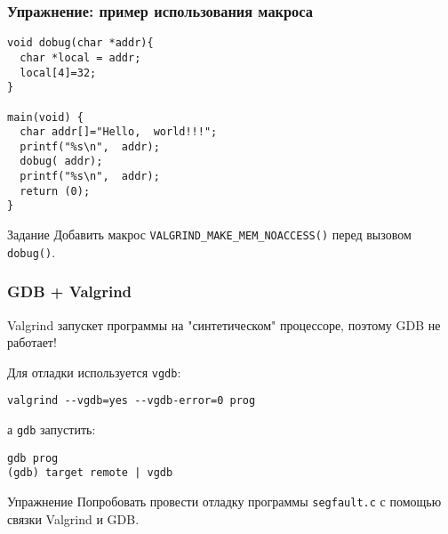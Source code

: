 \begin{frame}[fragile]
	\frametitle{Упражнение: пример использования макроса}

	\begin{lstlisting}
void dobug(char *addr){
  char *local = addr;
  local[4]=32;
}

main(void) {
  char addr[]="Hello,  world!!!";
  printf("%s\n",  addr);
  dobug( addr);
  printf("%s\n",  addr);
  return (0);
}
	\end{lstlisting}


	\begin{block}{Задание}
		Добавить макрос {\tt VALGRIND\_MAKE\_MEM\_NOACCESS()} перед вызовом {\tt dobug()}.
	\end{block}

\end{frame}


\begin{frame}[fragile]
	\frametitle{GDB + Valgrind}

	Valgrind запускет программы на "синтетическом" процессоре, поэтому GDB не работает!

	Для отладки используется {\tt vgdb}: \\

	\begin{verbatim}
valgrind --vgdb=yes --vgdb-error=0 prog
	\end{verbatim}


	а {\tt gdb} запустить:
	\begin{verbatim}
gdb prog
(gdb) target remote | vgdb
	\end{verbatim}

	\pause
	\begin{block}{Упражнение}
		Попробовать провести отладку программы {\tt segfault.c} с помощью связки Valgrind и GDB.
	\end{block}
\end{frame}



